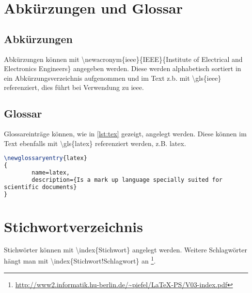 \section{Abkürzungen und Glossar}
\subsection{Abkürzungen}
Abkürzungen können mit \textbackslash newacronym\{ieee\}\{IEEE\}\{Institute of Electrical and Electronics Engineers\} angegeben werden. Diese werden alphabetisch sortiert in ein Abkürzungsverzeichnis aufgenommen und im Text z.b. mit \textbackslash gls\{ieee\} referenziert, dies führt bei Verwendung zu \gls{ieee}.
\subsection{Glossar}
Glossareinträge können, wie in \autoref{lst:tex} gezeigt, angelegt werden. Diese können im Text ebenfalls mit \textbackslash gls\{latex\} referenziert werden, z.B. \gls{latex}.
\begin{lstlisting}[caption=Glossareinträge, label=lst:tex, language=TeX]
 \newglossaryentry{latex}
{
        name=latex,
        description={Is a mark up language specially suited for
scientific documents}
}
\end{lstlisting}

\section{Stichwortverzeichnis}
Stichwörter können mit \textbackslash index\{Stichwort\} angelegt werden. Weitere Schlagwörter hängt man mit \textbackslash index\{Stichwort!Schlagwort\} an \footnote{\url{http://www2.informatik.hu-berlin.de/~piefel/LaTeX-PS/V03-index.pdf}}.
